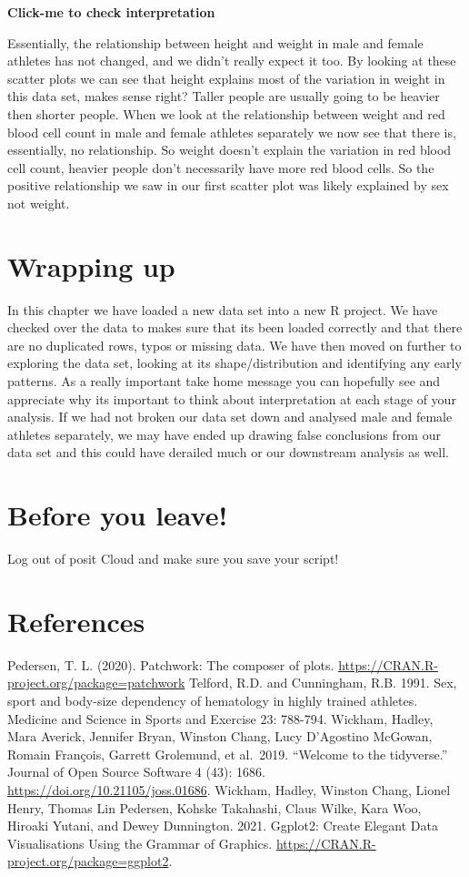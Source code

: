 \documentclass[
]{book}
\begin{document}
\textbf{Click-me to check interpretation}

Essentially, the relationship between height and weight in male and female athletes has not changed, and we didn't really expect it too. By looking at these scatter plots we can see that height explains most of the variation in weight in this data set, makes sense right? Taller people are usually going to be heavier then shorter people. When we look at the relationship between weight and red blood cell count in male and female athletes separately we now see that there is, essentially, no relationship. So weight doesn't explain the variation in red blood cell count, heavier people don't necessarily have more red blood cells. So the positive relationship we saw in our first scatter plot was likely explained by sex not weight.

\section{Wrapping up}\label{wrapping-up}

In this chapter we have loaded a new data set into a new R project. We have checked over the data to makes sure that its been loaded correctly and that there are no duplicated rows, typos or missing data. We have then moved on further to exploring the data set, looking at its shape/distribution and identifying any early patterns. As a really important take home message you can hopefully see and appreciate why its important to think about interpretation at each stage of your analysis. If we had not broken our data set down and analysed male and female athletes separately, we may have ended up drawing false conclusions from our data set and this could have derailed much or our downstream analysis as well.

\section{Before you leave!}\label{before-you-leave-7}

Log out of posit Cloud and make sure you save your script!

\section{References}\label{references-8}

Pedersen, T. L. (2020). Patchwork: The composer of plots. \url{https://CRAN.R-project.org/package=patchwork}
Telford, R.D. and Cunningham, R.B. 1991. Sex, sport and body-size dependency of hematology in highly trained athletes. Medicine and Science in Sports and Exercise 23: 788-794.
Wickham, Hadley, Mara Averick, Jennifer Bryan, Winston Chang, Lucy D'Agostino McGowan, Romain François, Garrett Grolemund, et al.~2019. ``Welcome to the tidyverse.'' Journal of Open Source Software 4 (43): 1686. \url{https://doi.org/10.21105/joss.01686}.
Wickham, Hadley, Winston Chang, Lionel Henry, Thomas Lin Pedersen, Kohske Takahashi, Claus Wilke, Kara Woo, Hiroaki Yutani, and Dewey Dunnington. 2021. Ggplot2: Create Elegant Data Visualisations Using the Grammar of Graphics. \url{https://CRAN.R-project.org/package=ggplot2}.
\end{document}
